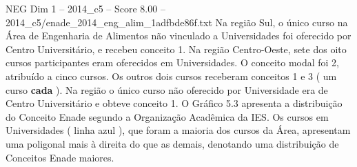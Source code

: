 \begin{textsample}{NEG Dim 1 – 2014\_c5 – Score 8.00 – 2014\_c5/enade\_2014\_eng\_alim\_1adfbde86f.txt}
Na região Sul, o único curso na Área de Engenharia de Alimentos não vinculado a Universidades foi oferecido por Centro Universitário, e recebeu conceito 1.
Na região Centro-Oeste, sete dos oito cursos participantes eram oferecidos em Universidades.
O conceito modal foi 2, atribuído a cinco cursos.
Os outros dois cursos receberam conceitos 1 e 3 ( um curso \textbf{cada} ).
Na região o único curso não oferecido por Universidade era de Centro Universitário e obteve conceito 1.
O Gráfico 5.3 apresenta a distribuição do Conceito Enade segundo a Organização Acadêmica da IES.
Os cursos em Universidades ( linha azul ), que foram a maioria dos cursos da Área, apresentam uma poligonal mais à direita do que as demais, denotando uma distribuição de Conceitos Enade maiores.

\end{textsample}
